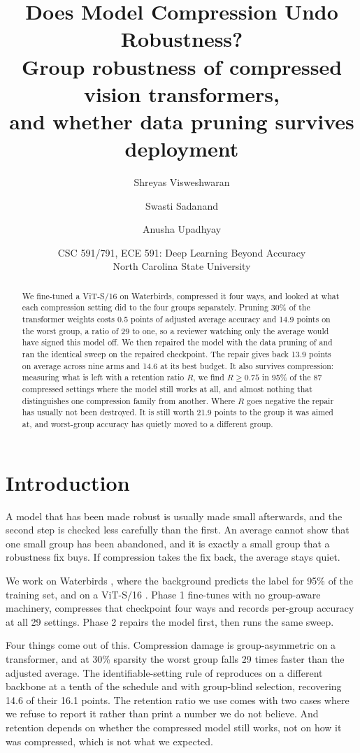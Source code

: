 \documentclass[11pt]{article}
\title{\vspace{-2.5em}Does Model Compression Undo Robustness?\\
\large Group robustness of compressed vision transformers,\\
and whether data pruning survives deployment}
\author{Shreyas Visweshwaran \and Swasti Sadanand \and Anusha Upadhyay}
\date{CSC 591/791, ECE 591: Deep Learning Beyond Accuracy\\North Carolina
State University}
\begin{document}
\maketitle
\vspace{-1.5em}

\begin{abstract}
\noindent
We fine-tuned a ViT-S/16 on Waterbirds, compressed it four ways, and looked at
what each compression setting did to the four groups separately. Pruning 30\%
of the transformer weights costs 0.5 points of adjusted average accuracy and
14.9 points on the worst group, a ratio of 29 to one, so a reviewer watching
only the average would have signed this model off. We then repaired the model
with the data pruning of \citet{mulchandani2025severing} and ran the identical
sweep on the repaired checkpoint. The repair gives back 13.9 points on average
across nine arms and 14.6 at its best budget. It also survives compression:
measuring what is left with a retention ratio $R$, we find $R \geq 0.75$ in
95\% of the 87 compressed settings where the model still works at all, and
almost nothing that distinguishes one compression family from another. Where
$R$ goes negative the repair has usually not been destroyed. It is still worth
21.9 points to the group it was aimed at, and worst-group accuracy has quietly
moved to a different group.
\end{abstract}

\section{Introduction}

A model that has been made robust is usually made small afterwards, and the
second step is checked less carefully than the first. An average cannot show that one small group has
been abandoned, and it is exactly a small group that a robustness fix buys.
If compression takes the fix back, the average stays quiet.

We work on Waterbirds \citep{sagawa2020distributionally}, where the background
predicts the label for 95\% of the training set, and on a ViT-S/16
\citep{dosovitskiy2021image}. Phase 1 fine-tunes with no group-aware
machinery, compresses that checkpoint four ways and records per-group accuracy
at all 29 settings. Phase 2 repairs the model first, then runs the same sweep.

Four things come out of this. Compression damage is group-asymmetric on a
transformer, and at 30\% sparsity the worst group falls 29 times faster than
the adjusted average. The identifiable-setting rule of
\citet{mulchandani2025severing} reproduces on a different backbone at a tenth
of the schedule and with group-blind selection, recovering 14.6 of their 16.1
points. The retention ratio we use comes with two cases where we refuse to
report it rather than print a number we do not believe. And retention depends
on whether the compressed model still works, not on how it was compressed,
which is not what we expected.
\end{document}
